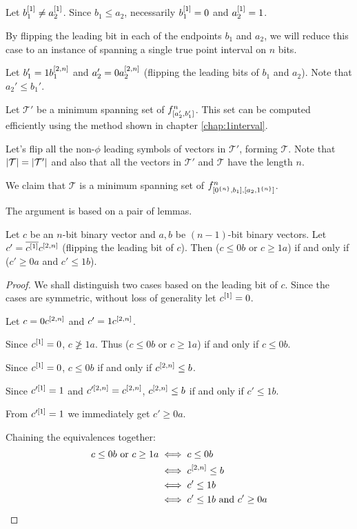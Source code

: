 
Let $b_1^{[1]} \neq a_2^{[1]}$.
Since $b_1 \leq a_2$,
necessarily $b_1^{[1]} = 0$ and $a_2^{[1]} = 1$.

By flipping the leading bit in each of the endpoints
$b_1$ and $a_2$,
we will reduce this case
to an instance of spanning a single true point interval
on $n$ bits.


Let $b_1' = 1 b_1^{[2, n]}$
and $a_2' = 0 a_2^{[2, n]}$
(flipping the leading bits of $b_1$ and $a_2$).
Note that $a_2' \leq b_1'$.

Let $\mathcal{T}'$ be a minimum spanning set
of $f^{n}_{[a_2', b_1']}$.
This set can be computed efficiently
using the method shown
in chapter \ref{chap:1interval}.

Let's flip all the non-$\phi$ leading symbols
of vectors in $\mathcal{T}'$,
forming $\mathcal{T}$.
Note that $\lvert\mathcal{T}\rvert = \lvert\mathcal{T}'\rvert$
and also that all the vectors in $\mathcal{T}'$
and $\mathcal{T}$ have the length $n$.

We claim that $\mathcal{T}$ is a minimum spanning set
of $f^{n}_{[0^{\{n\}}, b_1], [a_2, 1^{\{n\}}]}$.

The argument is based on a pair of lemmas.

\begin{lemma}
\label{lemma:cflip}
Let $c$ be an $n$-bit binary vector
and $a, b$ be $(n-1)$-bit binary vectors.
Let $c' = \overline{c^{[1]}} c^{[2, n]}$
(flipping the leading bit of $c$).
Then ($c \leq 0 b$ or $c \geq 1 a$)
if and only if
($c' \geq 0 a$ and $c' \leq 1 b$).
\end{lemma}

\begin{proof}
We shall distinguish two cases
based on the leading bit of $c$.
Since the cases are symmetric,
without loss of generality let $c^{[1]} = 0$.


Let $c = 0 c^{[2, n]}$ and $c' = 1 c^{[2, n]}$.

Since $c^{[1]} = 0$,
$c \ngeq 1 a$.
Thus ($c \leq 0 b$ or $c \geq 1 a$)
if and only if
$c \leq 0 b$.

Since $c^{[1]} = 0$,
$c \leq 0 b$
if and only if
$c^{[2, n]} \leq b$.

Since $c'^{[1]} = 1$
and $c'^{[2, n]} = c^{[2, n]}$,
$c^{[2, n]} \leq b$
if and only if
$c' \leq 1 b$.

From $c'^{[1]} = 1$ we immediately get $c' \geq 0 a$.

Chaining the equivalences together:
\begin{align*}
c \leq 0 b \text{ or }c \geq 1 a
&\iff c \leq 0 b \\
&\iff c^{[2, n]} \leq b \\
&\iff c' \leq 1 b \\
&\iff c' \leq 1 b \text{ and } c' \geq 0 a
\end{align*}
\end{proof}

